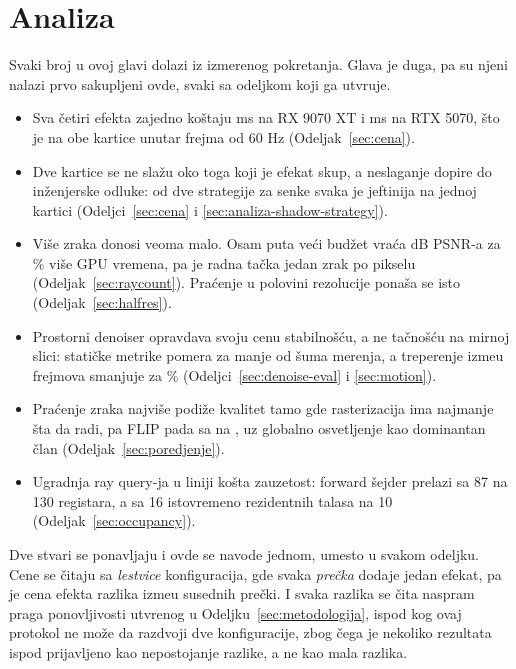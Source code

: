 \chapter{Analiza}
\label{ch:analiza}

Svaki broj u ovoj glavi dolazi iz izmerenog pokretanja. Glava je duga, pa su njeni nalazi prvo sakupljeni ovde, svaki sa odeljkom koji ga utvr\dj{}uje.

\begin{itemize}
\item Sva \v{c}etiri efekta zajedno ko\v{s}taju \perfFourEffectsAMD{} ms na RX 9070 XT i
      \perfFourEffectsNV{} ms na RTX 5070, \v{s}to je na obe kartice unutar frejma od 60 Hz
      (Odeljak~\ref{sec:cena}).
\item Dve kartice se ne sla\v{z}u oko toga koji je efekat skup, a neslaganje dopire do in\v{z}enjerske odluke: od dve strategije za senke svaka je jeftinija na jednoj kartici
      (Odeljci~\ref{sec:cena} i \ref{sec:analiza-shadow-strategy}).
\item Vi\v{s}e zraka donosi veoma malo. Osam puta ve\'ci bud\v{z}et vra\'ca \rcPsnrGain{} dB PSNR-a za
      \rcGpuPct\% vi\v{s}e GPU vremena, pa je radna ta\v{c}ka jedan zrak po pikselu
      (Odeljak~\ref{sec:raycount}). Pra\'cenje u polovini rezolucije pona\v{s}a se isto
      (Odeljak~\ref{sec:halfres}).
\item Prostorni denoiser opravdava svoju cenu stabilno\v{s}\'cu, a ne ta\v{c}no\v{s}\'cu na mirnoj slici: stati\v{c}ke metrike pomera za manje od \v{s}uma merenja, a treperenje izme\dj{}u frejmova
      smanjuje za \flickerPct\% (Odeljci~\ref{sec:denoise-eval} i \ref{sec:motion}).
\item Pra\'cenje zraka najvi\v{s}e podi\v{z}e kvalitet tamo gde rasterizacija ima najmanje \v{s}ta da
      radi, pa FLIP pada sa \qRasterFlip{} na \qAllRtFlip{}, uz globalno osvetljenje kao dominantan \v{c}lan
      (Odeljak~\ref{sec:poredjenje}).
\item Ugradnja ray query-ja u liniji ko\v{s}ta zauzetost: forward \v{s}ejder prelazi sa 87 na 130 registara, a sa
      16 istovremeno rezidentnih talasa na 10 (Odeljak~\ref{sec:occupancy}).
\end{itemize}

Dve stvari se ponavljaju i ovde se navode jednom, umesto u svakom odeljku. Cene se \v{c}itaju sa \emph{lestvice} konfiguracija, gde svaka \emph{prečka} dodaje jedan efekat, pa je cena efekta
razlika izme\dj{}u susednih pre\v{c}ki. I svaka razlika se \v{c}ita naspram praga ponovljivosti
utvr\dj{}enog u Odeljku~\ref{sec:metodologija}, ispod kog ovaj protokol ne mo\v{z}e da razdvoji dve
konfiguracije, zbog \v{c}ega je nekoliko rezultata ispod prijavljeno kao nepostojanje razlike, a ne kao
mala razlika.

